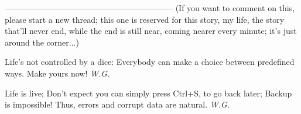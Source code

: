 --------------------------------------------------------------
(If you want to comment on this, please start a new thread; this one is reserved for this story, my life, the story that'll never end, while the end is still near, coming nearer every minute; it's just around the corner...)

Life's not controlled by a dice:
Everybody can make a choice between predefined ways. 
Make yours now!
\emph{W.G.}

Life is live;
Don't expect you can simply press Ctrl+S,
to go back later;
Backup is impossible!
Thus,
errors and corrupt data
are natural. 
\emph{W.G.}

